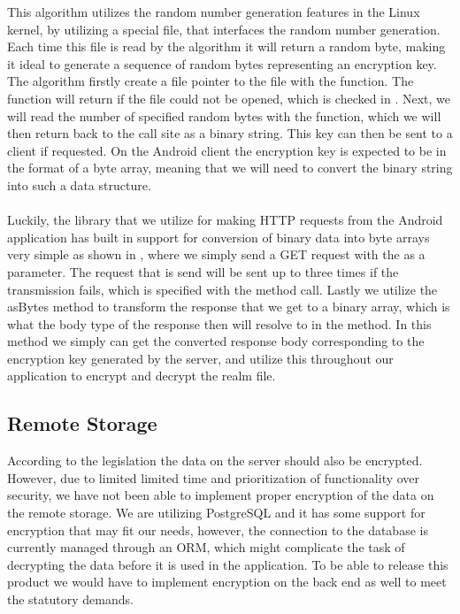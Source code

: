 This algorithm utilizes the random number generation features in the Linux kernel, by utilizing a special file,  that interfaces the random number generation. Each time this file is read by the algorithm it will return a random byte, making it ideal to generate a sequence of random bytes representing an encryption key. The algorithm firstly create a file pointer to the  file with the  function. The function will return  if the file could not be opened, which is checked in . Next, we will read the number of specified random bytes with the  function, which we will then return back to the call site as a binary string. This key can then be sent to a client if requested. On the Android client the encryption key is expected to be in the format of a byte array, meaning that we will need to convert the binary string into such a data structure. 
\\\\
Luckily, the library that we utilize for making HTTP requests from the Android application has built in support for conversion of binary data into byte arrays very simple as shown in , where we simply send a GET request with the  as a parameter. The request that is send will be sent up to three times if the transmission fails, which is specified with the  method call. Lastly we utilize the asBytes method to transform the response that we get to a binary array, which is what the body type of the response then will resolve to in the  method. In this method we simply can get the converted response body corresponding to the encryption key generated by the server, and utilize this throughout our application to encrypt and decrypt the realm file.    

\FloatBarrier

\subsection{Remote Storage}
\label{sub:remote_storage}

According to the legislation the data on the server should also be encrypted. However, due to limited limited time and prioritization of functionality over security, we have not been able to implement proper encryption of the data on the remote storage. We are utilizing PostgreSQL and it has some support for encryption that may fit our needs, however, the connection to the database is currently managed through an ORM, which might complicate the task of decrypting the data before it is used in the application. To be able to release this product we would have to implement encryption on the back end as well to meet the statutory demands.

